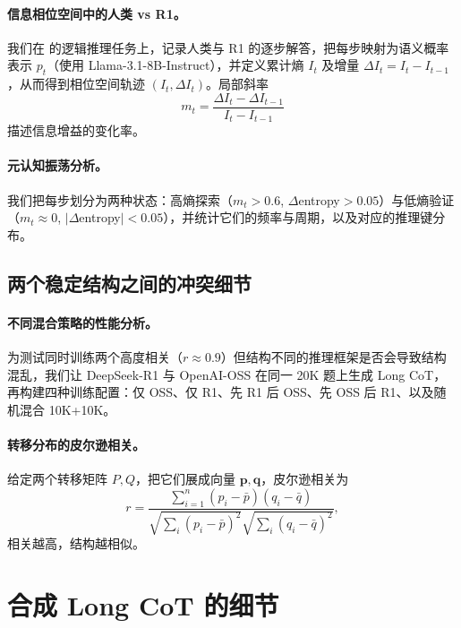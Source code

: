 \paragraph{信息相位空间中的人类 vs R1。}
我们在 \citet{du2025the} 的逻辑推理任务上，记录人类与 R1 的逐步解答，把每步映射为语义概率表示 $p_t$（使用 Llama-3.1-8B-Instruct），并定义累计熵 $I_t$ 及增量 $\Delta I_t=I_t-I_{t-1}$，从而得到相位空间轨迹 $(I_t,\Delta I_t)$。局部斜率
\begin{equation}
  m_t = \frac{\Delta I_t - \Delta I_{t-1}}{I_t - I_{t-1}}
\end{equation}
描述信息增益的变化率。\vspace{-5pt}

\paragraph{元认知振荡分析。}
我们把每步划分为两种状态：高熵探索（$m_t>0.6$, $\Delta$entropy$>0.05$）与低熵验证（$m_t\approx 0$, $|\Delta$entropy$|<0.05$），并统计它们的频率与周期，以及对应的推理键分布。


\subsection{两个稳定结构之间的冲突细节}
\label{sec:appendix_conflict}

\paragraph{不同混合策略的性能分析。}
为测试同时训练两个高度相关（$r\approx0.9$）但结构不同的推理框架是否会导致结构混乱，我们让 DeepSeek-R1 与 OpenAI-OSS 在同一 20K 题上生成 Long CoT，再构建四种训练配置：仅 OSS、仅 R1、先 R1 后 OSS、先 OSS 后 R1、以及随机混合 10K+10K。\vspace{-5pt}

\paragraph{转移分布的皮尔逊相关。}
给定两个转移矩阵 $P,Q$，把它们展成向量 $\mathbf{p},\mathbf{q}$，皮尔逊相关为
\begin{equation}
r = \frac{\sum_{i=1}^{n}(p_i-\bar{p})(q_i-\bar{q})}{\sqrt{\sum_{i}(p_i-\bar{p})^2}\sqrt{\sum_{i}(q_i-\bar{q})^2}},
\end{equation}
相关越高，结构越相似。


\section{\method 合成 Long CoT 的细节}
\label{app:settings}

